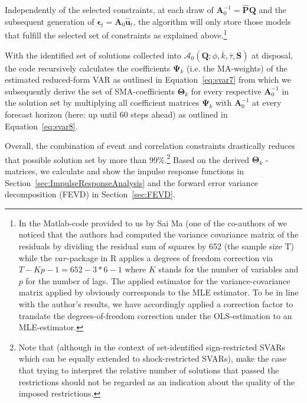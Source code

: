 \documentclass[a4paper,11pt,listof=nochaptergap,oneside,pointednumbers,bibtotoc,bigheadings,liststotoc,hidelinks]{scrbook}
\theoremstyle{mysatz}
\theoremstyle{mydefinition}
\theoremstyle{mytheorem}
\theoremstyle{mybemerkung}
\let\oldhat\hat
\newcommand{\vect}[1]{\boldsymbol{\mathbf{#1}}}
\newcommand{\hatt}[1]{\oldhat{\boldsymbol{\mathbf{#1}}}}
\begin{document}
Independently of the selected constraints, at each draw of $\vect{A}_0^{-1} = \hatt{\vect{P}}\vect{Q}$ and the subsequent generation of $\vect{\epsilon}_t = \vect{A}_0\hatt{\vect{u}}_t$, the algorithm will only store those models that fulfill the selected set of constraints as explained above.\footnote{In the Matlab-code provided to us by Sai Ma (one of the co-authors of \citet{ludvigsonetal:18, ludvigsonetal:19} we noticed that the authors had computed the variance covariance matrix of the residuals by dividing the residual sum of squares by 652 (the sample size T) while the $var$-package in R applies a degrees of freedom correction via $T-Kp-1 = 652 - 3*6 - 1$ where $K$ stands for the number of variables and $p$ for the number of lags. The applied estimator for the variance-covariance matrix applied by \citet{ludvigsonetal:18,ludvigsonetal:19} obviously corresponds to the MLE estimator. To be in line with the author's results, we have accordingly applied a correction factor to translate the degrees-of-freedom correction under the OLS-estimation to an MLE-estimator.\label{ftn:MatlabCodeFootnote}}

With the identified set of solutions collected into $\overline{\vect{\mathcal{A}}}_0(\vect{Q}; \phi, \overline{k}, \overline{\tau}, \vect{S})$ at disposal, the code recursively calculates the coefficients $\vect{\Psi}_k$ (i.e. the MA-weights) of the estimated reduced-form VAR as outlined in Equation~\ref{eq:svar7} from which we subsequently derive the set of SMA-coefficients $\vect{\Theta}_k$ for every respective $\vect{A}_{0}^{-1}$ in the solution set by multiplying all coefficient matrices $\vect{\Psi}_k$ with $\vect{A}_{0}^{-1}$ at every forecast horizon (here: up until 60 steps ahead) as outlined in Equation~\ref{eq:svar8}.

Overall, the combination of event and correlation constraints drastically reduces that possible solution set by more than 99\%.\footnote{Note that (although in the context of set-identified sign-restricted SVARs which can be equally extended to shock-restricted SVARs), \citet{lutkepohlkilian:17} make the case that trying to interpret the relative number of solutions that passed the restrictions should not be regarded as an indication about the quality of the imposed restrictions.} Based on the derived  $\vect{\Theta}_k$ - matrices, we calculate and show the impulse response functions in Section~\ref{sec:ImpulseResponseAnalysis} and the forward error variance decomposition (FEVD) in Section~\ref{sec:FEVD}.\\
\end{document}
